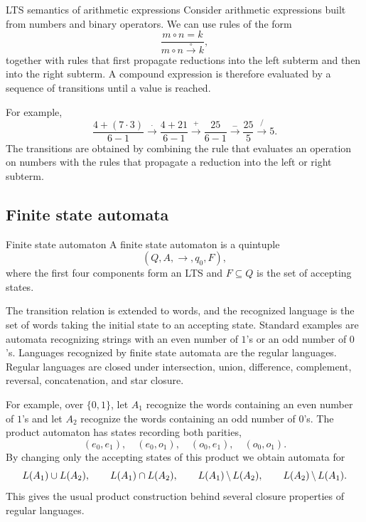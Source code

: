 \documentclass[a4paper]{article}
\newcommand{\trans}[1]{\xrightarrow{#1}}
\begin{document}
\begin{snippetexample}{LTS semantics of arithmetic expressions}
    Consider arithmetic expressions built from numbers and binary operators.
    We can use rules of the form
    \[
        \frac{m\circ n=k}{m\circ n\trans{\circ}k},
    \]
    together with rules that first propagate reductions into the left subterm and then into the right subterm.
    A compound expression is therefore evaluated by a sequence of transitions until a value is reached.
\end{snippetexample}

For example,
\[
    \frac{4+(7\cdot3)}{6-1}
    \trans{\cdot}
    \frac{4+21}{6-1}
    \trans{+}
    \frac{25}{6-1}
    \trans{-}
    \frac{25}{5}
    \trans{/}
    5.
\]
The transitions are obtained by combining the rule that evaluates an operation on numbers with the rules that propagate a reduction into the left or right subterm.

\subsection{Finite state automata}

\begin{snippetdefinition}{Finite state automaton}
    A finite state automaton is a quintuple
    \[
        (Q,A,\to,q_0,F),
    \]
    where the first four components form an LTS and \(F\subseteq Q\) is the set of accepting states.
\end{snippetdefinition}

The transition relation is extended to words, and the recognized language is the set of words taking the initial state to an accepting state.
Standard examples are automata recognizing strings with an even number of \(1\)'s or an odd number of \(0\)'s.
Languages recognized by finite state automata are the regular languages.
Regular languages are closed under intersection, union, difference, complement, reversal, concatenation, and star closure.

For example, over \(\{0,1\}\), let \(A_1\) recognize the words containing an even number of \(1\)'s and let \(A_2\) recognize the words containing an odd number of \(0\)'s.
The product automaton has states recording both parities,
\[
    (e_0,e_1),\quad (e_0,o_1),\quad (o_0,e_1),\quad (o_0,o_1).
\]
By changing only the accepting states of this product we obtain automata for
\[
    L(A_1)\cup L(A_2),\qquad
    L(A_1)\cap L(A_2),\qquad
    L(A_1)\,\backslash\, L(A_2),\qquad
    L(A_2)\,\backslash\, L(A_1).
\]
This gives the usual product construction behind several closure properties of regular languages.
\end{document}
